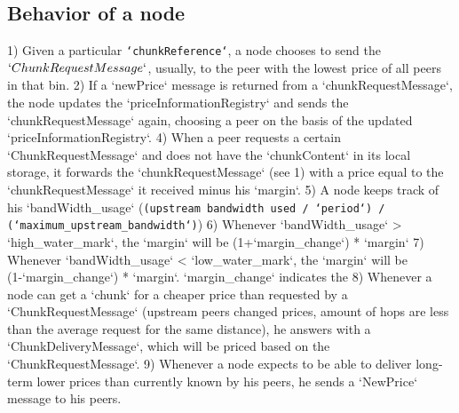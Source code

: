 \subsection{Behavior of a node}
1) Given a particular \texttt{`chunkReference`}, a node chooses to send the $`ChunkRequestMessage`$, usually, to the peer with the lowest price of all peers in that bin.
2) If a `newPrice` message is returned from a `chunkRequestMessage`, the node updates the `priceInformationRegistry` and sends the `chunkRequestMessage` again, choosing a peer on the basis of the updated `priceInformationRegistry`. 
4) When a peer requests a certain `ChunkRequestMessage` and does not have the `chunkContent` in its local storage, it forwards the `chunkRequestMessage` (see 1) with a price equal to the `chunkRequestMessage` it received minus his `margin`.
5) A node keeps track of his `bandWidth\_usage` (\texttt{(upstream bandwidth used / `period`) / (`maximum\_upstream\_bandwidth`)})
6) Whenever `bandWidth\_usage` > `high\_water\_mark`, the `margin` will be (1+`margin\_change`) * `margin`
7) Whenever `bandWidth\_usage` < `low\_water\_mark`, the `margin` will be (1-`margin\_change`) * `margin`. `margin\_change` indicates the 
8) Whenever a node can get a `chunk` for a cheaper price than requested by a `ChunkRequestMessage` (upstream peers changed prices, amount of hops are less than the average request for the same distance), he answers with a `ChunkDeliveryMessage`, which will be priced based on the `ChunkRequestMessage`. 
9) Whenever a node expects to be able to deliver long-term lower prices than currently known by his peers, he sends a `NewPrice` message to his peers. 
